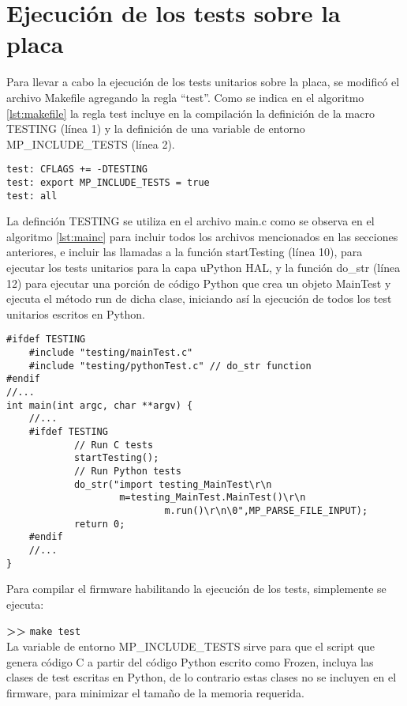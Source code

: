 \section{Ejecución de los tests sobre la placa}
\label{sec:testUnitariosPlaca}

Para llevar a cabo la ejecución de los tests unitarios sobre la placa, se modificó el archivo Makefile agregando la regla "`test"'. Como se indica en el algoritmo \ref{lst:makefile} la regla test incluye en la compilación la definición de la macro TESTING (línea 1) y la definición de una variable de entorno MP\_INCLUDE\_TESTS (línea 2).

\begin{lstlisting}[label={lst:makefile},caption=Regla test en Makefile.]
test: CFLAGS += -DTESTING
test: export MP_INCLUDE_TESTS = true
test: all 
\end{lstlisting}

La definción TESTING se utiliza en el archivo main.c como se observa en el algoritmo \ref{lst:mainc} para incluir todos los archivos mencionados en las secciones anteriores, e incluir las llamadas a la función startTesting (línea 10), para ejecutar los tests unitarios para la capa uPython HAL, y la función do\_str (línea 12) para ejecutar una porción de código Python que crea un objeto MainTest y ejecuta el método run de dicha clase, iniciando así la ejecución de todos los test unitarios escritos en Python.

\begin{lstlisting}[label={lst:mainc},caption=Inclusión de los archivos de test en el main.]
#ifdef TESTING
    #include "testing/mainTest.c"
    #include "testing/pythonTest.c" // do_str function
#endif
//...
int main(int argc, char **argv) {
	//...
	#ifdef TESTING
			// Run C tests
			startTesting();
			// Run Python tests
			do_str("import testing_MainTest\r\n
			        m=testing_MainTest.MainTest()\r\n
							m.run()\r\n\0",MP_PARSE_FILE_INPUT);
			return 0;
	#endif
	//...
}
\end{lstlisting}

Para compilar el firmware habilitando la ejecución de los tests, simplemente se ejecuta:

\textbf{{\fontsize{16}{16}\selectfont \textgreater\textgreater}} \texttt{make test}\\

La variable de entorno MP\_INCLUDE\_TESTS sirve para que el script que genera código C a partir del código Python escrito como Frozen, incluya las clases de test escritas en Python, de lo contrario estas clases no se incluyen en el firmware, para minimizar el tamaño de la memoria requerida.

